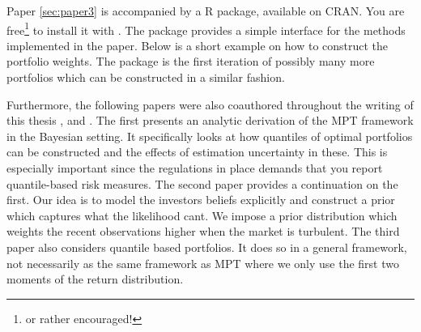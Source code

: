 \documentclass[]{book}\usepackage{knitr}
\begin{document}
Paper \ref{sec:paper3} is accompanied by a R package, available on CRAN. You are free\footnote{or rather encouraged!} to install it with \hlstd{(}\hlstd{)}. The package provides a simple interface for the methods implemented in the paper. Below is a short example on how to construct the portfolio weights. The package is the first iteration of possibly many more portfolios which can be constructed in a similar fashion. 

\begin{knitrout}
\color{fgcolor}
\end{knitrout}



Furthermore, the following papers were also coauthored throughout the writing of this thesis \cite{bodnar2020quantile}, \cite{bodnar2021bayesian}  and \cite{bodnar2021quantile}. The first presents an analytic derivation of the MPT framework in the Bayesian setting. It specifically looks at how quantiles of optimal portfolios can be constructed and the effects of estimation uncertainty in these. This is especially important since the regulations in place demands that you report quantile-based risk measures. The second paper provides a continuation on the first. Our idea is to model the investors beliefs explicitly and construct a prior which captures what the likelihood cant. We impose a prior distribution which weights the recent observations higher when the market is turbulent. The third paper also considers quantile based portfolios. It does so in a general framework, not necessarily as the same framework as MPT where we only use the first two moments of the return distribution.
\end{document}
